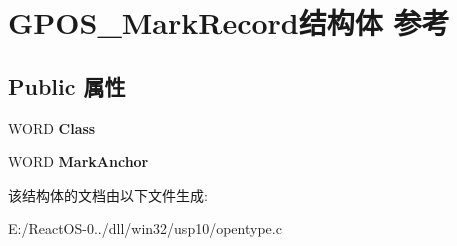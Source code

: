 \hypertarget{struct_g_p_o_s___mark_record}{}\section{G\+P\+O\+S\+\_\+\+Mark\+Record结构体 参考}
\label{struct_g_p_o_s___mark_record}
\subsection*{Public 属性}
\begin{DoxyCompactItemize}
\item 
\mbox{\label{struct_g_p_o_s___mark_record_a98457698a0e6ad406a30998875bf3bfa}} 
W\+O\+RD {\bfseries Class}
\item 
\mbox{\label{struct_g_p_o_s___mark_record_a46b28d65e335377bf319bda8afebcdc9}} 
W\+O\+RD {\bfseries Mark\+Anchor}
\end{DoxyCompactItemize}


该结构体的文档由以下文件生成\+:\begin{DoxyCompactItemize}
\item 
E\+:/\+React\+O\+S-\/0../dll/win32/usp10/opentype.\+c\end{DoxyCompactItemize}
